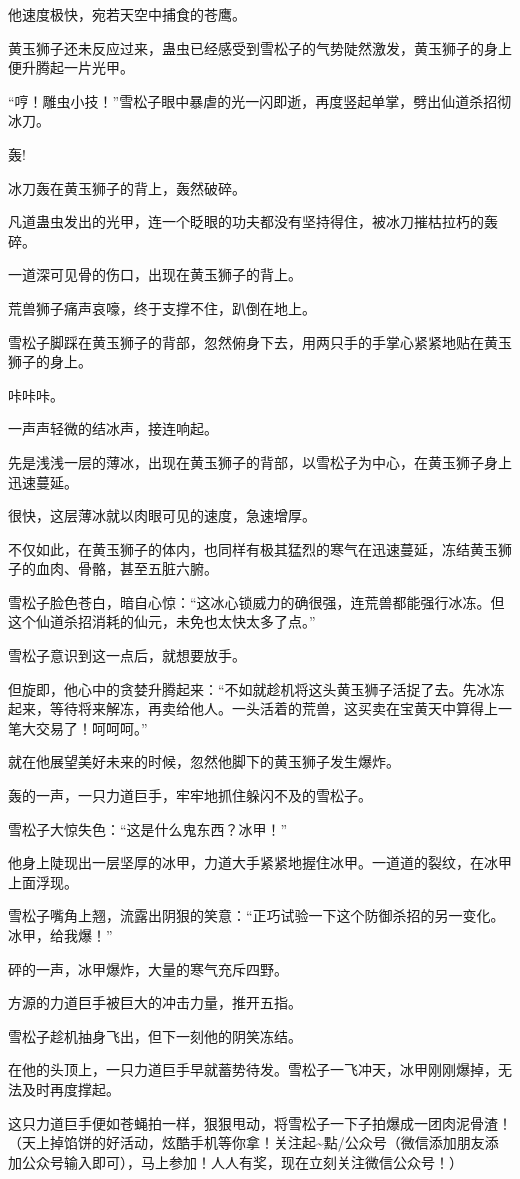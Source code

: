 \begin{this_body}
他速度极快，宛若天空中捕食的苍鹰。

黄玉狮子还未反应过来，蛊虫已经感受到雪松子的气势陡然激发，黄玉狮子的身上便升腾起一片光甲。

“哼！雕虫小技！”雪松子眼中暴虐的光一闪即逝，再度竖起单掌，劈出仙道杀招彻冰刀。

轰!

冰刀轰在黄玉狮子的背上，轰然破碎。

凡道蛊虫发出的光甲，连一个眨眼的功夫都没有坚持得住，被冰刀摧枯拉朽的轰碎。

一道深可见骨的伤口，出现在黄玉狮子的背上。

荒兽狮子痛声哀嚎，终于支撑不住，趴倒在地上。

雪松子脚踩在黄玉狮子的背部，忽然俯身下去，用两只手的手掌心紧紧地贴在黄玉狮子的身上。

咔咔咔。

一声声轻微的结冰声，接连响起。

先是浅浅一层的薄冰，出现在黄玉狮子的背部，以雪松子为中心，在黄玉狮子身上迅速蔓延。

很快，这层薄冰就以肉眼可见的速度，急速增厚。

不仅如此，在黄玉狮子的体内，也同样有极其猛烈的寒气在迅速蔓延，冻结黄玉狮子的血肉、骨骼，甚至五脏六腑。

雪松子脸色苍白，暗自心惊：“这冰心锁威力的确很强，连荒兽都能强行冰冻。但这个仙道杀招消耗的仙元，未免也太快太多了点。”

雪松子意识到这一点后，就想要放手。

但旋即，他心中的贪婪升腾起来：“不如就趁机将这头黄玉狮子活捉了去。先冰冻起来，等待将来解冻，再卖给他人。一头活着的荒兽，这买卖在宝黄天中算得上一笔大交易了！呵呵呵。”

就在他展望美好未来的时候，忽然他脚下的黄玉狮子发生爆炸。

轰的一声，一只力道巨手，牢牢地抓住躲闪不及的雪松子。

雪松子大惊失色：“这是什么鬼东西？冰甲！”

他身上陡现出一层坚厚的冰甲，力道大手紧紧地握住冰甲。一道道的裂纹，在冰甲上面浮现。

雪松子嘴角上翘，流露出阴狠的笑意：“正巧试验一下这个防御杀招的另一变化。冰甲，给我爆！”

砰的一声，冰甲爆炸，大量的寒气充斥四野。

方源的力道巨手被巨大的冲击力量，推开五指。

雪松子趁机抽身飞出，但下一刻他的阴笑冻结。

在他的头顶上，一只力道巨手早就蓄势待发。雪松子一飞冲天，冰甲刚刚爆掉，无法及时再度撑起。

这只力道巨手便如苍蝇拍一样，狠狠甩动，将雪松子一下子拍爆成一团肉泥骨渣！（天上掉馅饼的好活动，炫酷手机等你拿！关注起\~{}點/公众号（微信添加朋友添加公众号输入即可），马上参加！人人有奖，现在立刻关注微信公众号！）

\end{this_body}

